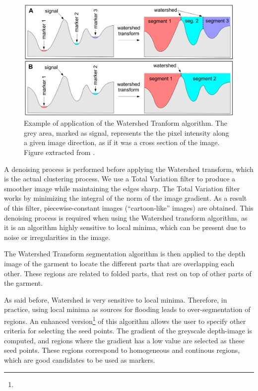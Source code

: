 \begin{figure}[thpb]
    \centering
    \includegraphics[width=\textwidth]
    {figures/watershed-example.png}
    \caption[Example of application of the Watershed Tranform algorithm]
    {Example of application of the Watershed Tranform algorithm. The grey area, marked as signal, represents the the pixel intensity along a given image direction, as if it was a cross section of the image. Figure extracted from \cite{rs6010776}.}
    \label{fig:watershed_example}
\end{figure}

A denoising process is performed before applying the Watershed transform, which is the actual clustering process. We use a Total Variation filter \cite{chambolle2004algorithm} to produce a smoother image while maintaining the edges sharp. The Total Variation filter works by minimizing the integral of the norm of the image gradient. As a result of this filter, piecewise-constant images (``cartoon-like'' images) are obtained. This denoising process is required when using the Watershed transform algorithm, as it is an algorithm highly sensitive to local minima, which can be present due to noise or irregularities in the image. 

The Watershed Transform segmentation algorithm is then applied to the depth image of the garment to locate the different parts that are overlapping each other. These regions are related to folded parts, that rest on top of other parts of the garment. 

As said before, Watershed is very sensitive to local minima. Therefore, in practice, using local minima as sources for flooding leads to over-segmentation of regions. An enhanced version\footnote{} of this algorithm allows the user to specify other criteria for selecting the seed points. The gradient of the greyscale depth-image is computed, and regions where the gradient has a low value are selected as these seed points. These regions correspond to homogeneous and continous regions, which are good candidates to be used as markers.


